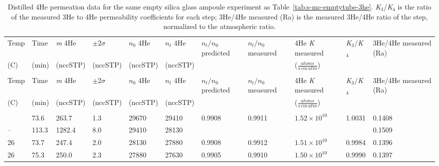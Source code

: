 \begin{chplandscape}
\begin{small}
\setlength{\tabcolsep}{2pt}
\begin{longtable}{p{1.1cm}p{1.1cm}p{1.3cm}p{1.5cm}p{1.3cm}p{1.3cm}p{1.3cm}p{1.3cm}p{1.5cm}p{1.0cm}p{1.3cm}}
\caption{Distilled 4He permeation data for the same empty silica glass ampoule experiment as Table~\ref{tab:s-mc-emptytube-3he}. \emph{K}$_{3}$/\emph{K}$_{4}$ is the ratio of the measured 3He to 4He permeability coefficients for each step; 3He/4He measured (Ra) is the measured 3He/4He ratio of the step, normalized to the atmospheric ratio.}
\label{tab:s-mc-emptytube-4he}\\
\tophline
Temp & Time & \emph{m} 4He & $\pm2\sigma$ & $n_{0}$ 4He & $n_{t}$ 4He & $n_t/n_0$\newline predicted & $n_t/n_0$\newline measured & 4He \emph{K} \newline measured & \emph{K}$_{3}/$\emph{K}$_{4}$ & 3He/4He \newline measured (Ra) \\
(\textdegree{}C) & (min) & (nccSTP) & (nccSTP) & (nccSTP) & (nccSTP) &  &  & ($\frac{atoms}{s\,cm\,atm}$) &  &  \\
\middlehline
\endfirsthead
\multicolumn{11}{l}{\textit{(continued)}} \\
\tophline
Temp & Time & \emph{m} 4He & $\pm2\sigma$ & $n_{0}$ 4He & $n_{t}$ 4He & $n_t/n_0$\newline predicted & $n_t/n_0$\newline measured & 4He \emph{K} \newline measured & \emph{K}$_{3}/$\emph{K}$_{4}$ & 3He/4He \newline measured (Ra) \\
(\textdegree{}C) & (min) & (nccSTP) & (nccSTP) & (nccSTP) & (nccSTP) &  &  & ($\frac{atoms}{s\,cm\,atm}$) &  &  \\
\middlehline
\endhead
\middlehline
\multicolumn{11}{r}{\textit{continued on next page}} \\
\endfoot
\bottomhline
\endlastfoot
26 & 73.6 & 263.7 & 1.3 & 29670 & 29410 & 0.9908 & 0.9911 & \(1.52\!\times\!10^{10}\) & 1.0031 & 0.1408 \\
-- & 113.3 & 1282.4 & 8.0 & 29410 & 28130 &  &  &  &  & 0.1509 \\
26 & 73.7 & 247.4 & 2.0 & 28130 & 27880 & 0.9908 & 0.9912 & \(1.51\!\times\!10^{10}\) & 0.9984 & 0.1396 \\
26 & 75.3 & 250.0 & 2.3 & 27880 & 27630 & 0.9905 & 0.9910 & \(1.50\!\times\!10^{10}\) & 0.9990 & 0.1397 \\

\end{longtable}
\end{small}
\end{chplandscape}
